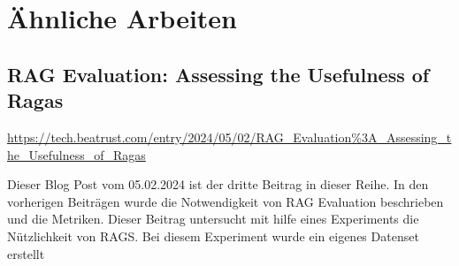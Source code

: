 \section{Ähnliche Arbeiten}

\subsection{RAG Evaluation: Assessing the Usefulness of Ragas}
\url{https://tech.beatrust.com/entry/2024/05/02/RAG_Evaluation%3A_Assessing_the_Usefulness_of_Ragas}


Dieser Blog Post vom 05.02.2024 ist der dritte Beitrag in dieser Reihe. In den vorherigen Beiträgen wurde die Notwendigkeit von RAG Evaluation beschrieben und die Metriken.
Dieser Beitrag untersucht mit hilfe eines Experiments die Nützlichkeit von RAGS. Bei diesem Experiment wurde ein eigenes Datenset erstellt